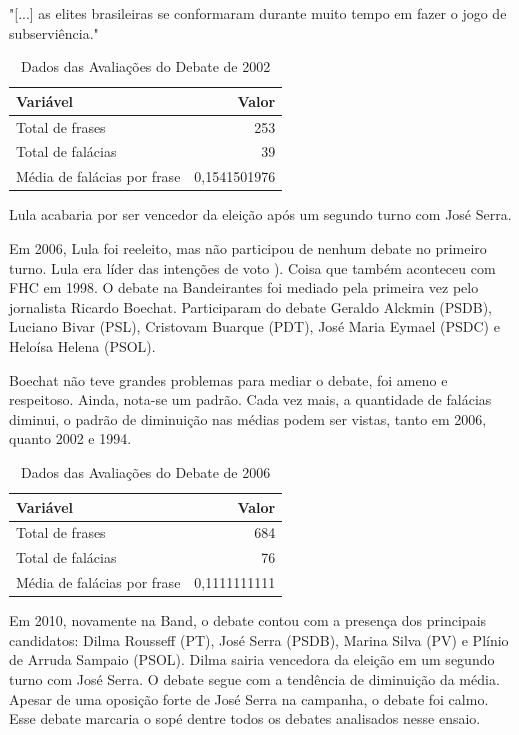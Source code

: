 \documentclass[12pt]{article}
\begin{document}
"[...] as elites brasileiras se conformaram durante muito tempo em fazer o jogo de subserviência."


\begin{table}[ht]
\centering
\caption{Dados das Avaliações do Debate de 2002}
\label{tab:exTable1}
\begin{tabular}{l r}
\hline
\textbf{Variável} & \textbf{Valor} \\
\hline
Total de frases & 253 \\
Total de falácias & 39 \\
Média de falácias por frase & 0,1541501976 \\
\hline
\end{tabular}
\end{table}

Lula acabaria por ser vencedor da eleição após um segundo turno com José Serra.

Em 2006, Lula foi reeleito, mas não participou de nenhum debate no primeiro turno. Lula era líder das intenções de voto \cite{InfoMoney-12}). Coisa que também aconteceu com FHC em 1998. O debate na Bandeirantes foi mediado pela primeira vez pelo jornalista Ricardo Boechat. Participaram do debate Geraldo Alckmin (PSDB), Luciano Bivar (PSL), Cristovam Buarque (PDT), José Maria Eymael (PSDC) e Heloísa Helena (PSOL). 

Boechat não teve grandes problemas para mediar o debate, foi ameno e respeitoso. Ainda, nota-se um padrão. Cada vez mais, a quantidade de falácias diminui, o padrão de diminuição nas médias podem ser vistas, tanto em 2006, quanto 2002 e 1994.

\begin{table}[ht]
\centering
\caption{Dados das Avaliações do Debate de 2006}
\label{tab:exTable1}
\begin{tabular}{l r}
\hline
\textbf{Variável} & \textbf{Valor} \\
\hline
Total de frases & 684 \\
Total de falácias & 76 \\
Média de falácias por frase & 0,1111111111 \\
\hline
\end{tabular}
\end{table}

Em 2010, novamente na Band, o debate contou com a presença dos principais candidatos: Dilma Rousseff (PT), José Serra (PSDB), Marina Silva (PV) e Plínio de Arruda Sampaio (PSOL). Dilma sairia vencedora da eleição em um segundo turno com José Serra. O debate segue com a tendência de diminuição da média. Apesar de uma oposição forte de José Serra na campanha, o debate foi calmo. Esse debate marcaria o sopé dentre todos os debates analisados nesse ensaio. 
\end{document}
